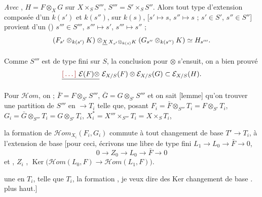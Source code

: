 \documentclass[11pt,a4paper]{article}
\begin{document}
\struck{\ill{} \ill{}} \emph{Avec} ,
$H = F \otimes_X G$ sur $X \times_S S'''$, $S''' = S' \times_S S''$.
Alors tout type d'extension composée d'un $k(s')$ et $k(s'')$, sur
$k(s)$, [$s' \mapsto s$, $s'' \mapsto s$ ; $s' \in S'$, $s'' \in S''$]
provient d'un () $s''' \in S'''$, $s''' \mapsto s'$,
$s''' \mapsto s''$ ; 
\[
  (F_{s'} \otimes_{k(s')} K) \otimes_{\struck{X}\, X_{s'} \otimes_{k(s)} K}
  (G_{s''} \otimes_{k(s'')} K) \simeq H_{s'''} .
\]

Comme $S'''$ est de type fini sur $S$, la conclusion pour $\otimes$
s'ensuit, on a bien prouvé
\[
  \struck{\ill{}\ \mathcal{E}(F) \otimes}\ \mathcal{E}_{X/S}(F) \otimes
  \mathcal{E}_{X/S}(G) \subset \mathcal{E}_{X/S}(H) .
\]

Pour $\mathcal{H}om$, on  \ill{} ; $\bar{F} = F \otimes_{S'} S'''$,
$\bar{G} = G \otimes_{S'} S'''$ et on sait [lemme] qu'on 
trouver une partition  de $S'''$ en \ill{}
$\longrightarrow T_i$ telle que, posant $F_i = \bar{F} \otimes_{S'''} T_i
= F \otimes_{S'} T_i$, $G_i = \bar{G} \otimes_{S'''} T_i = G \otimes_{S'}
T_i$, $X_i^{*} = X''' \times_{S'''} T_i = X \times_S T_i$,

la formation de $\mathcal{H}om_{X_i}(F_i, G_i)$ commute à tout
changement de base $T' \to T_i$,  à
l'extension de base [pour ceci, écrivons  une
 libre de type fini $L_1 \to L_0 \to \bar{F} \to 0$,
\[
  0 \to Z_0 \to L_0 \to \bar{F} \to 0
\]
et \struck{\ill{}} \ill{}, $Z_i$ \ill{} \ill{} \ill{}, \ill{} \ill{}
\ill{} \ill{} $\operatorname{Ker}\bigl(\mathcal{H}om(L_0, F) \to
\mathcal{H}om(L_1, F)\bigr)$.

\ill{} \ill{} \ill{}  \ill{} \ill{} \ill{} une
  \ill{} en \ill{} $T_i$, telle
que \ill{} \ill{} \ill{} $T_i$, la formation \ill{}, je veux dire \ill{}
des Ker  \ill{} \ill{} changement de base \ill{}
. \ill{} \ill{} \ill{} \ill{} plus haut.]
\end{document}
